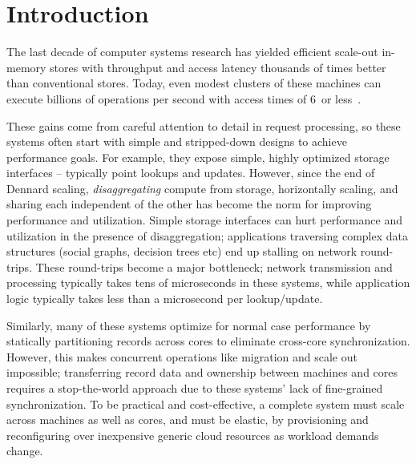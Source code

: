 \chapter{Introduction}

The last decade of computer systems research has yielded efficient
scale-out in-memory stores with throughput and access latency thousands
of times better than conventional stores.
%
Today, even modest clusters of
these machines can execute billions of operations per second with access
times of 6~\us or less~\cite{mica,ramcloud,farm-2014}.

These gains come from careful attention to detail in request processing,
so these systems often start with simple and stripped-down designs to
achieve performance goals.
%
%
For example, they expose simple, highly
optimized storage interfaces – typically point lookups and updates.
%
However,
%
since the end
of Dennard scaling, \emph{disaggregating} compute from storage,
horizontally scaling, and sharing each independent of the other has become the norm
for improving performance and utilization.
%
Simple storage interfaces can
hurt performance and utilization in the presence of disaggregation; applications
traversing complex data structures (social graphs, decision trees etc)
end up stalling on network round-trips.
%
These round-trips become a major
bottleneck; network transmission and processing typically takes tens of
microseconds in these systems, while application logic typically takes
less than a microsecond per lookup/update.
%
%

Similarly, many of these systems optimize for normal case performance by statically
partitioning records across cores to eliminate cross-core synchronization.
%
However, this makes concurrent operations like migration and scale out
impossible; transferring record data and ownership between machines and
cores requires a stop-the-world approach due to these systems’ lack of
fine-grained synchronization.
%
To be practical and cost-effective, a complete system
must scale across
machines as well as cores, and must be elastic, by provisioning and
reconfiguring over inexpensive generic cloud resources as workload
demands change.


